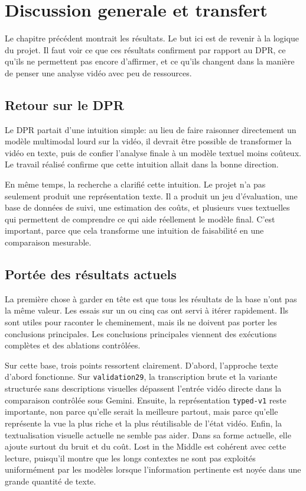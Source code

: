 \chapter{Discussion generale et transfert}

Le chapitre pr\'ec\'edent montrait les r\'esultats. Le but ici est de revenir \`a la logique du projet. Il faut voir ce que ces r\'esultats confirment par rapport au DPR, ce qu'ils ne permettent pas encore d'affirmer, et ce qu'ils changent dans la mani\`ere de penser une analyse vid\'eo avec peu de ressources.

\section{Retour sur le DPR}

Le DPR partait d'une intuition simple: au lieu de faire raisonner directement un mod\`ele multimodal lourd sur la vid\'eo, il devrait \^etre possible de transformer la vid\'eo en texte, puis de confier l'analyse finale \`a un mod\`ele textuel moins co\^uteux. Le travail r\'ealis\'e confirme que cette intuition allait dans la bonne direction.

En m\^eme temps, la recherche a clarifi\'e cette intuition. Le projet n'a pas seulement produit une repr\'esentation texte. Il a produit un jeu d'\'evaluation, une base de donn\'ees de suivi, une estimation des co\^uts, et plusieurs vues textuelles qui permettent de comprendre ce qui aide r\'eellement le mod\`ele final. C'est important, parce que cela transforme une intuition de faisabilit\'e en une comparaison mesurable.

\section{Port\'ee des r\'esultats actuels}

La premi\`ere chose \`a garder en t\^ete est que tous les r\'esultats de la base n'ont pas la m\^eme valeur. Les essais sur un ou cinq cas ont servi \`a it\'erer rapidement. Ils sont utiles pour raconter le cheminement, mais ils ne doivent pas porter les conclusions principales. Les conclusions principales viennent des ex\'ecutions compl\`etes et des ablations contr\^ol\'ees.

Sur cette base, trois points ressortent clairement. D'abord, l'approche texte d'abord fonctionne. Sur \texttt{validation29}, la transcription brute et la variante structur\'ee sans descriptions visuelles d\'epassent l'entr\'ee vid\'eo directe dans la comparaison contr\^ol\'ee sous Gemini. Ensuite, la repr\'esentation \texttt{typed-v1} reste importante, non parce qu'elle serait la meilleure partout, mais parce qu'elle repr\'esente la vue la plus riche et la plus r\'eutilisable de l'\'etat vid\'eo. Enfin, la textualisation visuelle actuelle ne semble pas aider. Dans sa forme actuelle, elle ajoute surtout du bruit et du co\^ut. Lost in the Middle \cite{liu2024_lost} est coh\'erent avec cette lecture, puisqu'il montre que les longs contextes ne sont pas exploit\'es uniform\'ement par les mod\`eles lorsque l'information pertinente est noy\'ee dans une grande quantit\'e de texte.

